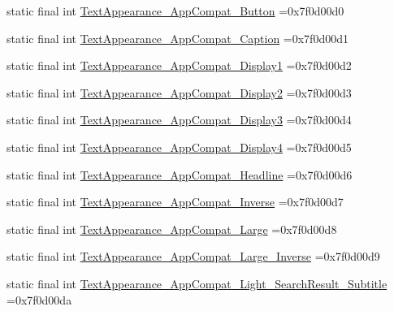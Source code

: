 \begin{DoxyCompactItemize}
\item 
static final int \mbox{\hyperlink{classbr_1_1unb_1_1cic_1_1mp_1_1marketmaster_1_1R_1_1style_aa6df0f33d5eedb40747c59d537bc1a77}{Text\+Appearance\+\_\+\+App\+Compat\+\_\+\+Button}} =0x7f0d00d0
\item 
static final int \mbox{\hyperlink{classbr_1_1unb_1_1cic_1_1mp_1_1marketmaster_1_1R_1_1style_ac9ab2daa82bd3ef4878000ba6b7d84f5}{Text\+Appearance\+\_\+\+App\+Compat\+\_\+\+Caption}} =0x7f0d00d1
\item 
static final int \mbox{\hyperlink{classbr_1_1unb_1_1cic_1_1mp_1_1marketmaster_1_1R_1_1style_a55f7a661689561a6b7aba4562c5e33ec}{Text\+Appearance\+\_\+\+App\+Compat\+\_\+\+Display1}} =0x7f0d00d2
\item 
static final int \mbox{\hyperlink{classbr_1_1unb_1_1cic_1_1mp_1_1marketmaster_1_1R_1_1style_aeba3826cb23498b26c34b67c26b8a110}{Text\+Appearance\+\_\+\+App\+Compat\+\_\+\+Display2}} =0x7f0d00d3
\item 
static final int \mbox{\hyperlink{classbr_1_1unb_1_1cic_1_1mp_1_1marketmaster_1_1R_1_1style_acdbdeb9b43f50dedbcaf22e834ca7e6a}{Text\+Appearance\+\_\+\+App\+Compat\+\_\+\+Display3}} =0x7f0d00d4
\item 
static final int \mbox{\hyperlink{classbr_1_1unb_1_1cic_1_1mp_1_1marketmaster_1_1R_1_1style_a10c0b2ebb2384d75ce52bfe6f664e0b1}{Text\+Appearance\+\_\+\+App\+Compat\+\_\+\+Display4}} =0x7f0d00d5
\item 
static final int \mbox{\hyperlink{classbr_1_1unb_1_1cic_1_1mp_1_1marketmaster_1_1R_1_1style_a1bb399cc13e0f39b5bc3bb9928a01754}{Text\+Appearance\+\_\+\+App\+Compat\+\_\+\+Headline}} =0x7f0d00d6
\item 
static final int \mbox{\hyperlink{classbr_1_1unb_1_1cic_1_1mp_1_1marketmaster_1_1R_1_1style_a3921cc7fa3926f0c58d12fd074ad6b96}{Text\+Appearance\+\_\+\+App\+Compat\+\_\+\+Inverse}} =0x7f0d00d7
\item 
static final int \mbox{\hyperlink{classbr_1_1unb_1_1cic_1_1mp_1_1marketmaster_1_1R_1_1style_ab470002debba65db28c26beeb45998ac}{Text\+Appearance\+\_\+\+App\+Compat\+\_\+\+Large}} =0x7f0d00d8
\item 
static final int \mbox{\hyperlink{classbr_1_1unb_1_1cic_1_1mp_1_1marketmaster_1_1R_1_1style_a1479a1b774b919e7704d00fd7e41d5d7}{Text\+Appearance\+\_\+\+App\+Compat\+\_\+\+Large\+\_\+\+Inverse}} =0x7f0d00d9
\item 
static final int \mbox{\hyperlink{classbr_1_1unb_1_1cic_1_1mp_1_1marketmaster_1_1R_1_1style_ac6d1b904bfd8a7d2fbff9f90251406a7}{Text\+Appearance\+\_\+\+App\+Compat\+\_\+\+Light\+\_\+\+Search\+Result\+\_\+\+Subtitle}} =0x7f0d00da

\end{DoxyCompactItemize}
